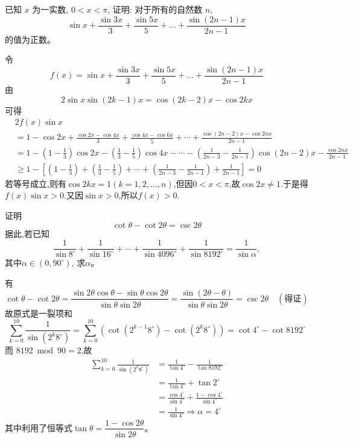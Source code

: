 \begin{questions}
    \question 已知 $x$ 为一实数, $0 < x < \pi$, 证明: 对于所有的自然数 $n$,
    \[
    \sin x + \frac{\sin 3x}{3} + \frac{\sin 5x}{5} + \dots + \frac{\sin(2n-1)x}{2n-1}
    \]
    的值为正数。
    \begin{solution}
        令 $$f(x) = \sin x + \frac{\sin 3x}{3} + \frac{\sin 5x}{5} + \dots + \frac{\sin(2n-1)x}{2n-1}$$
        由
        $$2\sin x \sin(2k-1)x = \cos(2k-2)x - \cos 2kx$$
        可得
        \begin{align*}
            &2f(x)\sin x\\
            &=1-\cos2x+\frac{\cos2x-\cos4x}{3}+\frac{\cos4x-\cos6x}{5}+\cdots+\frac{\cos(2n-2)x-\cos2nx}{2n-1} \\ 
            &=1-\left(1-\frac{1}{3}\right)\cos2x-\left(\frac{1}{3}-\frac{1}{5}\right)\cos4x-\cdots-\left(\frac{1}{2n-3}-\frac{1}{2n-1}\right)\cos(2n-2)x-\frac{\cos2nx}{2n-1} \\ 
            &\ge 1-\left[\left(1-\frac{1}{3}\right)+\left(\frac{1}{3}-\frac{1}{5}\right)+\cdots+\left(\frac{1}{2n-3}-\frac{1}{2n-1}\right)+\frac{1}{2n-1}\right]=0
        \end{align*}
        若等号成立,则有$\cos2kx=1(k=1,2,\dots,n)$,但因$0<x<\pi$,故$\cos2x\ne1$.于是得 $f(x)\sin x>0$.又因$\sin x>0$,所以$f(x)>0.$
    \end{solution}

    \question 证明  
    \[
    \cot\theta-\cot2\theta=\csc2\theta
    \]
    据此,若已知  
    \[
    \frac1{\sin8^\circ}+ \frac1{\sin16^\circ}+\cdots+\frac1{\sin4096^\circ}+ \frac1{\sin8192^\circ}
    =\frac1{\sin\alpha},
    \]
    其中$\alpha\in (0,90^\circ)$, 求$\alpha$。
    \begin{solution}
        有
        \[
        \cot \theta - \cot 2\theta 
        = \frac{\sin 2\theta \cos \theta - \sin \theta \cos 2\theta}{\sin \theta \sin 2\theta}
        = \frac{\sin(2\theta - \theta)}{\sin \theta \sin 2\theta}
        = \csc 2\theta \quad(\text{得证})
        \]
        故原式是一裂项和
        \[
        \sum_{k=0}^{10}\frac1{\sin\left(2^k8^\circ\right)}=\sum_{k=0}^{10}\left(\cot (2^{k-1}8^\circ) - \cot (2^k8^\circ)\right)=\cot 4^\circ - \cot 8192^\circ
        \]
        而 \(8192 \bmod 90 = 2\),故
        \begin{align*}
        \sum_{k=0}^{10}\frac1{\sin\left(2^k8^\circ\right)}
        &=\frac1{\tan4^\circ}-\frac1{\tan8192^\circ}\\
        &=\frac1{\tan4^\circ}+\tan2^\circ\\
        &=\frac{\cos4^\circ}{\sin4^\circ}+\frac{1-\cos4^\circ}{\sin4^\circ}\\
        &=\frac1{\sin4^\circ} \Rightarrow \alpha=4^\circ
        \end{align*}
        其中利用了恒等式$\tan \theta=\dfrac{1-\cos 2\theta}{\sin 2\theta}$。
    \end{solution}  


\end{questions}
